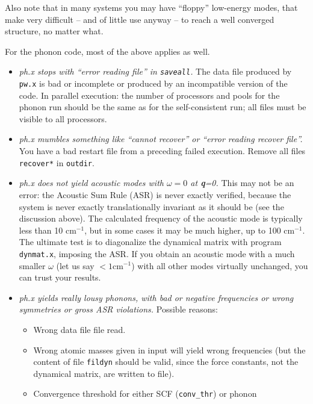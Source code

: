 \documentclass[12pt]{article}
\begin{document}
\begin{itemize}
      Also note that in many systems you may have ``floppy'' low-energy
      modes, that make very difficult -- and of little use anyway
      -- to reach a well converged structure, no matter what.
\end{itemize}

For the phonon code, most of the above applies as well.
\begin{itemize}
\item {\em ph.x stops with ``error reading file'' in {\tt saveall}.}
      The data file produced by {\tt pw.x} is bad or incomplete or
      produced by an incompatible version of the code. In parallel
      execution: the number of processors and pools for the phonon
      run should be the same as for the self-consistent run;
      all files must be visible to all processors.
\item {\em ph.x mumbles something like ``cannot recover'' or
      ``error reading recover file''.}  You have a bad restart file 
      from a preceding failed execution. Remove all files {\tt recover*}
      in {\tt outdir}.
\item {\em ph.x does not yield acoustic modes with 
      $\omega=0$ at {\bf q}=0.}
      This may not be an error: the Acoustic Sum Rule (ASR) is never
      exactly verified, because the system is never exactly translationally 
      invariant as it should be (see the discussion above).
      The calculated frequency of the acoustic mode is typically less 
      than 10 cm$^{-1}$, but in some cases it may be much higher,
      up to 100 cm$^{-1}$. The ultimate test is to diagonalize the
      dynamical matrix with program {\tt dynmat.x}, imposing the ASR.
      If you obtain an acoustic mode with a much smaller $\omega$ 
      (let us say $ < 1 \mbox{cm}^{-1}$) with all other modes virtually 
      unchanged, you can trust your results.
\item {\em ph.x yields really lousy phonons, with bad or negative
      frequencies or wrong symmetries or gross ASR violations.}
      Possible reasons:
      \begin{itemize}
      \item
      Wrong data file file read.
      \item
      Wrong atomic masses given in input will yield wrong frequencies
      (but the content of file {\tt fildyn} should be valid, since
       the force constants, not the dynamical matrix, are written to file).
      \item
      Convergence threshold for either SCF ({\tt conv\_thr}) or phonon

\end{itemize}
\end{itemize}
\end{document}
